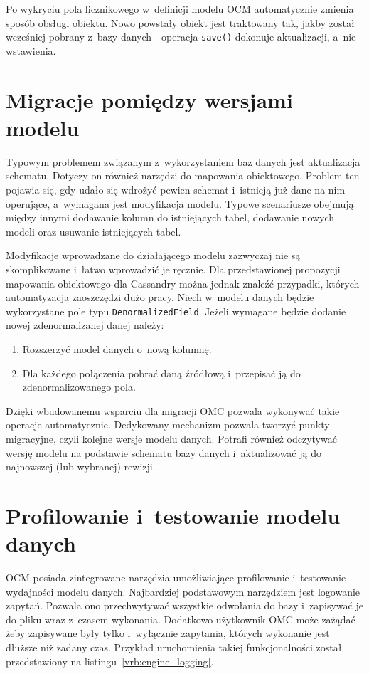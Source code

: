 Po wykryciu pola licznikowego w~definicji modelu OCM automatycznie zmienia sposób obsługi obiektu. Nowo powstały obiekt jest traktowany tak, jakby został wcześniej pobrany z~bazy danych - operacja \verb+save()+ dokonuje aktualizacji, a~nie wstawienia. 

\section{Migracje pomiędzy wersjami modelu}

Typowym problemem związanym z~wykorzystaniem baz danych jest aktualizacja schematu. Dotyczy on również narzędzi do mapowania obiektowego. Problem ten pojawia się, gdy udało się wdrożyć pewien schemat i~istnieją już dane na nim operujące, a~wymagana jest modyfikacja modelu. Typowe scenariusze obejmują między innymi dodawanie kolumn do istniejących tabel, dodawanie nowych modeli oraz usuwanie istniejących tabel. 

Modyfikacje wprowadzane do działającego modelu zazwyczaj nie są skomplikowane i~łatwo wprowadzić je ręcznie. Dla przedstawionej propozycji mapowania obiektowego dla Cassandry można jednak znaleźć przypadki, których automatyzacja zaoszczędzi dużo pracy. Niech w~modelu danych będzie wykorzystane pole typu \verb+DenormalizedField+. Jeżeli wymagane będzie dodanie nowej zdenormalizanej danej należy:

\begin{enumerate}
	\item Rozszerzyć model danych o~nową kolumnę.
	\item Dla każdego połączenia pobrać daną źródłową i~przepisać ją do zdenormalizowanego pola.
\end{enumerate}

Dzięki wbudowanemu wsparciu dla migracji OMC pozwala wykonywać takie operacje automatycznie. Dedykowany mechanizm pozwala tworzyć punkty migracyjne, czyli kolejne wersje modelu danych. Potrafi również odczytywać wersję modelu na podstawie schematu bazy danych i~aktualizować ją do najnowszej (lub wybranej) rewizji.

\section{Profilowanie i~testowanie modelu danych}

OCM posiada zintegrowane narzędzia umożliwiające profilowanie i~testowanie wydajności modelu danych. Najbardziej podstawowym narzędziem jest logowanie zapytań. Pozwala ono przechwytywać wszystkie odwołania do bazy i~zapisywać je do pliku wraz z~czasem wykonania. Dodatkowo użytkownik OMC może zażądać żeby zapisywane były tylko i~wyłącznie zapytania, których wykonanie jest dłuższe niż zadany czas. Przykład uruchomienia takiej funkcjonalności został przedstawiony na listingu~\ref{vrb:engine_logging}.

